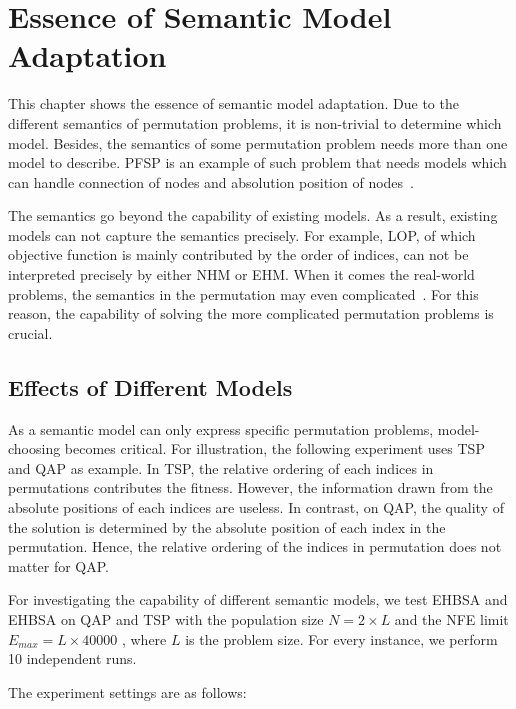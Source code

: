 
\section{Essence of Semantic Model Adaptation}
\label{ch:essence_of_adaptation}




This chapter shows the essence of semantic model adaptation. Due to the different semantics of permutation problems, it is non-trivial to determine which model. Besides, the semantics of some permutation problem needs more than one model to describe. PFSP is an example of such problem that needs models which can handle connection of nodes and absolution position of nodes~\citep{tsutsui2006node}. 

The semantics go beyond the capability of existing models. As a result, existing models can not capture the semantics precisely. For example, LOP, of which objective function is mainly contributed by the order of indices, can not be interpreted precisely by either NHM or EHM. When it comes the real-world problems, the semantics in the permutation may even complicated~\citep{ceberio2012review}. For this reason, the capability of solving the more complicated permutation problems is crucial.

\subsection{Effects of Different Models}
As a semantic model can only express specific permutation problems, model-choosing becomes critical. For illustration, the following experiment uses TSP and QAP as example. In TSP, the relative ordering of each indices in permutations contributes the fitness. However, the information drawn from the absolute positions of each indices are useless. In contrast, on QAP, the quality of the solution is determined by the absolute position of each index in the permutation. Hence, the relative ordering of the indices in permutation does not matter for QAP.


  For investigating the capability of different semantic models, we test EHBSA and EHBSA on QAP and TSP with the population size $N = 2 \times L$ and the NFE limit $E_{max} = L \times 40000$ , where $L$ is the problem size. For every instance, we perform 10 independent runs.

 The experiment settings are as follows: 
\begin{itemize}
\end{itemize}

